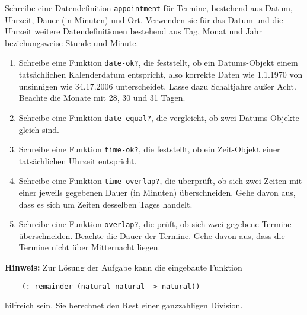 \begin{aufgabe}

  Schreibe eine Datendefinition
  \lstinline{appointment} für Termine, bestehend aus Datum, Uhrzeit,
  Dauer (in Minuten) und Ort.  Verwenden sie für das Datum und die
  Uhrzeit weitere Datendefinitionen bestehend aus Tag, Monat und Jahr
  beziehungsweise Stunde und Minute.

  \begin{enumerate}
  \item Schreibe eine Funktion \lstinline{date-ok?}, die feststellt,
    ob ein Datums-Objekt einem tatsächlichen Kalenderdatum entspricht,
    also korrekte Daten wie 1.1.1970 von unsinnigen wie 34.17.2006
    unterscheidet. Lasse dazu Schaltjahre außer Acht. Beachte
    die Monate mit 28, 30 und 31 Tagen.
  \item Schreibe eine Funktion \lstinline{date-equal?}, die
    vergleicht, ob zwei Datums-Objekte gleich sind.
  \item Schreibe eine Funktion \lstinline{time-ok?}, die feststellt,
    ob ein Zeit-Objekt einer tatsächlichen Uhrzeit entspricht.
  \item Schreibe eine Funktion \lstinline{time-overlap?}, die
    überprüft, ob sich zwei Zeiten mit einer jeweils gegebenen Dauer
    (in Minuten) überschneiden. Gehe davon aus, dass es sich um
    Zeiten desselben Tages handelt.
  \item Schreibe eine Funktion \lstinline{overlap?}, die prüft, ob
    sich zwei gegebene Termine überschneiden. Beachte die Dauer
    der Termine. Gehe davon aus, dass die Termine nicht über
    Mitternacht liegen.
  \end{enumerate}
  \textbf{Hinweis:} Zur Lösung der Aufgabe kann die eingebaute
  Funktion
  \begin{lstlisting}
    (: remainder (natural natural -> natural))
  \end{lstlisting}

  hilfreich sein. Sie berechnet den Rest einer ganzzahligen Division.

\end{aufgabe}

